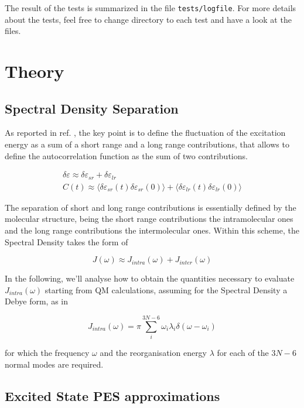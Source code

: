 \documentclass[a4paper]{article}
\begin{document}
The result of the tests is summarized in the file \verb|tests/logfile|. For more details about the tests, feel free to change directory to each test and have a look at the files.

\section{Theory}

\subsection*{Spectral Density Separation}

As reported in ref. , the key point is to define the fluctuation of the excitation energy as a sum of a short range and a long range contributions, that allows to define the autocorrelation function as the sum of two contributions.

\begin{gather}
\delta\varepsilon \approx \delta\varepsilon_{sr} + \delta\varepsilon_{lr} \\
C(t) \approx \langle \delta\varepsilon_{sr}(t) \delta\varepsilon_{sr}(0) \rangle + \langle \delta\varepsilon_{lr}(t) \delta\varepsilon_{lr}(0) \rangle
\end{gather}

The separation of short and long range contributions is essentially defined by the molecular structure, being the short range contributions the intramolecular ones and the long range contributions the intermolecular ones.
Within this scheme, the Spectral Density takes the form of
 
\begin{equation}
J(\omega) \approx J_{intra}(\omega) + J_{inter}(\omega)
\end{equation}

In the following, we'll analyse how to obtain the quantities necessary to evaluate $J_{intra}(\omega)$ starting from QM calculations, assuming for the Spectral Density a Debye form, as in

\begin{equation}
J_{intra}(\omega) = \pi \sum_i^{3N-6} \omega_i \lambda_i \delta(\omega - \omega_i)
\end{equation}

for which the frequency $\omega$ and the reorganisation energy $\lambda$ for each of the $3N-6$ normal modes are required.

\subsection*{Excited State PES approximations\cite{Santoro2012}}
\end{document}
